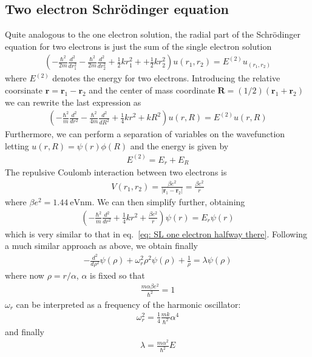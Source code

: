 \documentclass[11pt, a4paper]{article}
\newcommand{\SL}{Schr\"{o}dinger }
\begin{document}
		\subsection{Two electron \SL equation}
			Quite analogous to the one electron solution, the radial part of the \SL equation for two electrons is just the sum of the single electron solution
			\begin{align*}
				\left( -\frac{\hbar^2}{2m}\frac{d^2}{dr_1^2} - \frac{\hbar^2}{2m}\frac{d^2}{dr_2^2} + \frac{1}{2}kr_1^2 ++ \frac{1}{2}kr_2^2 \right) u(r_1,r_2) = E^{(2)}u_(r_1, r_2)
			\end{align*}		
			where $E^{(2)}$ denotes the energy for two electrons. Introducing the relative coorsinate $\mathbf{r} = \mathbf{r}_1 - \mathbf{r}_2$ and the center of mass coordinate $\mathbf{R}=(1/2)(\mathbf{r}_1+\mathbf{r}_2)$ we can rewrite the last expression as
			\begin{align*}
				\left( -\frac{\hbar^2}{m}\frac{d^2}{dr^2} - \frac{\hbar^2}{4m}\frac{d^2}{dR^2} + \frac{1}{4}kr^2 + kR^2 \right) u(r, R) = E^{(2)}u(r,R)
			\end{align*}
			Furthermore, we can perform a separation of variables on the wavefunction letting $u(r, R) = \psi(r)\phi(R)$ and the energy is given by
			\begin{align*}
				E^{(2)} = E_r + E_R
			\end{align*}
			The repulsive Coulomb interaction between two electrons is
			\begin{align*}
				V(r_1, r_2) = \frac{\beta e^2}{|\mathbf{r}_1-\mathbf{r}_2|} = \frac{\beta e^2}{r}
			\end{align*}									
			where $\beta e^2 = 1.44 \ \mathrm{eV nm}$. We can then simplify further, obtaining
			\begin{align*}
				\left( -\frac{\hbar^2}{m}\frac{d^2}{dr^2} + \frac{1}{4}kr^2 + \frac{\beta e^2}{r} \right) \psi(r) = E_r\psi(r)
			\end{align*}
			which is very similar to that in eq.~\eqref{eq: SL one electron halfway there}. Following a much similar approach as above, we obtain finally
			\begin{align}
				-\frac{d^2}{d\rho^2}\psi(\rho) + \omega_r^2 \rho^2 \psi(\rho) + \frac{1}{\rho} = \lambda \psi (\rho) \label{eq: SL two electrons simple}
			\end{align}
			where now $\rho = r/\alpha$, $\alpha$ is fixed so that
			\begin{align*}
				\frac{m\alpha \beta e^2}{\hbar^2} = 1
			\end{align*}
			$\omega_r$ can be interpreted as a frequency of the harmonic oscillator:
			\begin{align*}
				\omega_r^2 = \frac{1}{4}\frac{mk}{\hbar^2}\alpha^4
			\end{align*}
			and finally
			\begin{align*}
				\lambda = \frac{m\alpha^2}{\hbar^2}E
			\end{align*}
			
\end{document}
